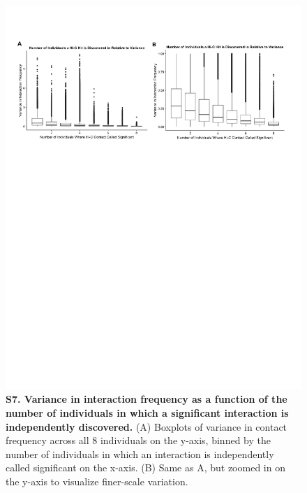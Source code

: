 \begin{figure}[!htb]
\centering
\includegraphics[width=6in]{img/figS7.pdf}
\caption[Variance in interaction frequency as a function of the number of individuals in which a significant interaction is independently discovered.]{\textbf{S7. Variance in interaction frequency as a function of the number of individuals in which a significant interaction is independently discovered.} (A) Boxplots of variance in contact frequency across all 8 individuals on the y-axis, binned by the number of individuals in which an interaction is independently called significant on the x-axis. (B) Same as A, but zoomed in on the y-axis to visualize finer-scale variation.}
\label{fig:ch02-figS7}
\end{figure}

